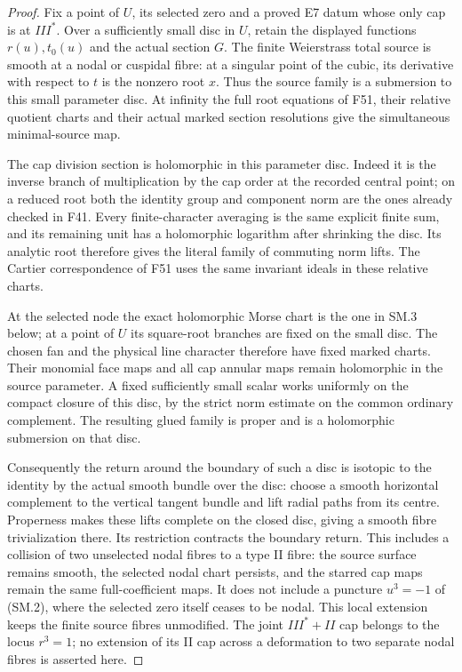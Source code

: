 \begin{proof}
Fix a point of \(U\), its selected zero and a proved E7
datum whose only cap is at \(III^*\). Over a sufficiently small disc in
\(U\), retain the displayed functions \(r(u),t_0(u)\) and
the actual section \(G\). The finite Weierstrass total source
is smooth at a nodal or cuspidal fibre: at a singular point
of the cubic, its derivative with respect to \(t\) is the
nonzero root \(x\). Thus the source family is a submersion
to this small parameter disc. At infinity the full root
equations of F51, their relative quotient charts and their
actual marked section resolutions give the simultaneous
minimal-source map.

The cap division section is holomorphic in this parameter
disc. Indeed it is the inverse branch of multiplication by
the cap order at the recorded central point; on a reduced
root both the identity group and component norm are the
ones already checked in F41. Every finite-character
averaging is the same explicit finite sum, and its remaining
unit has a holomorphic logarithm after shrinking the disc.
Its analytic root therefore gives the literal family of
commuting norm lifts. The Cartier correspondence of F51
uses the same invariant ideals in these relative charts.

At the selected node the exact holomorphic Morse chart is
the one in SM.3 below; at a point of \(U\) its square-root
branches are fixed on the small disc. The chosen fan and
the physical line character therefore have fixed marked
charts. Their monomial face maps and all cap annular maps
remain holomorphic in the source parameter. A fixed
sufficiently small scalar works uniformly on the compact
closure of this disc, by the strict norm estimate on the
common ordinary complement. The resulting glued family
is proper and is a holomorphic submersion on that disc.

Consequently the return around the boundary of such a
disc is isotopic to the identity by the actual smooth
bundle over the disc: choose a smooth horizontal complement
to the vertical tangent bundle and lift radial paths from
its centre. Properness makes these lifts complete on the
closed disc, giving a smooth fibre trivialization there.
Its restriction contracts the boundary return. This
includes a collision of two
unselected nodal fibres to a type II fibre: the source
surface remains smooth, the selected nodal chart persists,
and the starred cap maps remain the same full-coefficient
maps. It does not include a puncture \(u^3=-1\) of (SM.2),
where the selected zero itself ceases to be nodal.
This local extension keeps the finite source fibres unmodified.
The joint \(III^*+II\) cap belongs to the locus \(r^3=1\);
no extension of its II cap across a deformation to two
separate nodal fibres is asserted here.


\end{proof}
